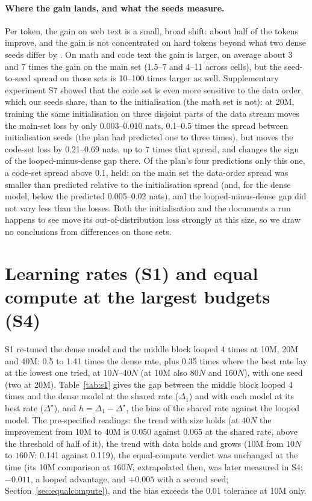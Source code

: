 \paragraph{Where the gain lands, and what the seeds measure.} Per token, the gain on web text is a small, broad shift:
about half of the tokens improve, and the gain is not concentrated on hard tokens beyond what two dense seeds differ by
. On math and code text the gain is
larger, on average about 3 and 7 times the gain on the main set (1.5--7 and 4--11 across cells),
but the seed-to-seed spread on those sets is 10--100 times larger as well. Supplementary experiment S7
 showed that the code set is even more sensitive to the data order, which our seeds share, than to
the initialisation (the math set is not): at 20M, training the same initialisation on three disjoint parts of the data
stream moves
the main-set loss by only 0.003--0.010 nats, 0.1--0.5 times the spread between initialisation seeds (the plan
had predicted one to three times), but moves the code-set loss by 0.21--0.69 nats, up to 7 times that spread, and changes
the sign of the looped-minus-dense gap there. Of the plan's four predictions only this one, a code-set spread above 0.1,
held: on the main set the data-order spread was smaller than predicted relative to the initialisation spread (and, for
the dense model, below the predicted 0.005--0.02 nats), and the looped-minus-dense gap did not vary less than the losses. Both the initialisation and the documents a run happens to see move its out-of-distribution loss strongly at this
size, so we draw no conclusions from differences on those sets.

\section{Learning rates (S1) and equal compute at the largest budgets (S4)}
\label{app:lr}

S1 re-tuned the dense model and the middle block looped 4 times at 10M, 20M and 40M: 0.5 to 1.41 times the dense rate,
plus 0.35 times where the best rate lay at the lowest one tried, at $10N$--$40N$ (at 10M also $80N$ and $160N$), with one
seed (two at 20M). Table~\ref{tab:s1} gives the gap between the middle block looped 4 times and the dense model at the
shared rate
($\Delta_1$) and with each model at its best rate ($\Delta^{\star}$), and $h = \Delta_1 - \Delta^{\star}$, the bias of
the shared rate against the looped model. The pre-specified readings: the trend with size holds (at $40N$ the
improvement from 10M to 40M is 0.050 against 0.065 at the shared rate, above the threshold of half of it), the trend
with data holds and grows (10M from $10N$ to $160N$: 0.141 against 0.119), the equal-compute verdict was unchanged
at the time (its 10M comparison at $160N$, extrapolated then, was later measured in S4: $-0.011$, a looped advantage, and
$+0.005$ with a second seed; Section~\ref{sec:equalcompute}), and
the bias exceeds the 0.01 tolerance at 10M only.

